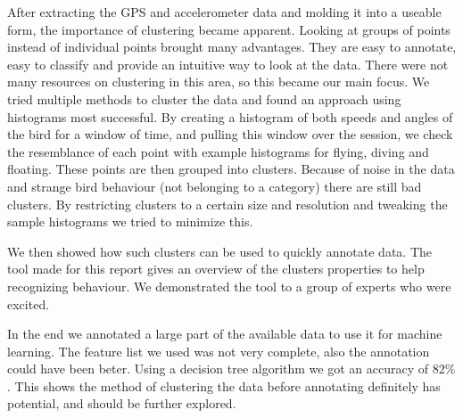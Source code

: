 After extracting the GPS and accelerometer data and molding it into a useable form, the importance of clustering became apparent. Looking at groups of points instead of individual points brought many advantages. They are easy to annotate, easy to classify and provide an intuitive way to look at the data. There were not many resources on clustering in this area, so this became our main focus. We tried multiple methods to cluster the data and found an approach using histograms most successful. By creating a histogram of both speeds and angles of the bird for a window of time, and pulling this window over the session, we check the resemblance of each point with example histograms for flying, diving and floating. These points are then grouped into clusters. Because of noise in the data and strange bird behaviour (not belonging to a category) there are still bad clusters. By restricting clusters to a certain size and resolution and tweaking the sample histograms we tried to minimize this. 

We then showed how such clusters can be used to quickly annotate data. The tool made for this report gives an overview of the clusters properties to help recognizing behaviour. We demonstrated the tool to a group of experts who were excited.

In the end we annotated a large part of the available data to use it for machine learning. The feature list we used was not very complete, also the annotation could have been beter. Using a decision tree algorithm we got an accuracy of $82\%$. This shows the method of clustering the data before annotating definitely has potential, and should be further explored.